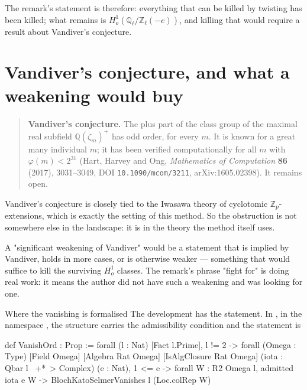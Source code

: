 The remark's statement is therefore: everything that can be killed by twisting
has been killed; what remains is $H^1_o(\mathbb{Q}_\ell/\mathbb{Z}_\ell(-e))$,
and killing that would require a result about Vandiver's conjecture.

\section{Vandiver's conjecture, and what a weakening would buy}\begin{quote}
\textbf{Vandiver's conjecture.} The plus part of the class group of the maximal
real subfield $\mathbb{Q}(\zeta_m)^+$ has odd order, for every $m$. It is
known for a great many individual $m$; it has been verified computationally for
all $m$ with $\varphi(m) < 2^{31}$ (Hart, Harvey and Ong,
\emph{Mathematics of Computation} \textbf{86} (2017), 3031--3049, DOI
\texttt{10.1090/mcom/3211}, arXiv:1605.02398). It remains open.
\end{quote}

Vandiver's conjecture is closely tied to the Iwasawa theory of cyclotomic
$\mathbb{Z}_p$-extensions, which is exactly the setting of this method. So
the obstruction is not somewhere else in the landscape: it is in the theory
the method itself uses.

A "significant weakening of Vandiver" would be a statement that is implied by
Vandiver, holds in more cases, or is otherwise weaker --- something that would
suffice to kill the surviving $H^1_o$ classes. The remark's phrase "fight for"
is doing real work: it means the author did not have such a weakening and was
looking for one.

\begin{seamnote}{Where the vanishing is formalised}
The development has the statement. In
,
in the namespace , the structure  carries
the admissibility condition and the statement is

{\footnotesize
\begin{leanquote}
def VanishOrd : Prop :=
  forall (l : Nat) [Fact l.Prime], l != 2 ->
forall (Omega : Type) [Field Omega] [Algebra Rat Omega]
      [IsAlgClosure Rat Omega]
      (iota : Qbar l ~+*~> Complex) (e : Nat), 1 <= e ->
      forall W : R2 Omega l, admitted iota e W ->
        BlochKatoSelmerVanishes l (Loc.colRep W)
\end{leanquote}
}
\end{seamnote}

